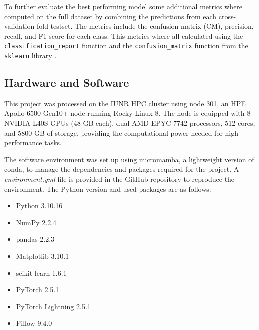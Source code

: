     To further evaluate the best performing model some additional metrics where computed on the full dataset by combining the predictions from each cross-validation fold testset.
    The metrics include the confusion matrix (CM), precision, recall, and F1-score for each class.
    This metrics where all calculated using the \texttt{classification\_report} function and the \texttt{confusion\_matrix} function from the \texttt{sklearn} library \autocite{pedregosaScikitlearnMachineLearning2011}.

    \subsection{Hardware and Software}

    This project was processed on the IUNR HPC cluster using node 301, an HPE Apollo 6500 Gen10+ node running Rocky Linux 8. 
    The node is equipped with 8 NVIDIA L40S GPUs (48 GB each), dual AMD EPYC 7742 processors, 512 cores, and 5800 GB of storage, providing the computational power needed for high-performance tasks.

    The software environment was set up using micromamba, a lightweight version of conda, to manage the dependencies and packages required for the project.
    A \textit{environment.yml} file is provided in the GitHub repository to reproduce the environment.
    The Python version and used packages are as follows:

    \begin{itemize}
        \item Python 3.10.16
        \item NumPy 2.2.4
        \item pandas 2.2.3
        \item Matplotlib 3.10.1
        \item scikit-learn 1.6.1
        \item PyTorch 2.5.1
        \item PyTorch Lightning 2.5.1
        \item Pillow 9.4.0
    \end{itemize}


